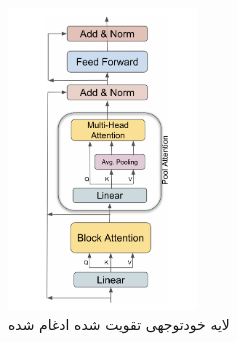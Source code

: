 \begin{figure}[!h]
	\begin{center}
		\includegraphics[height=8cm]{pooling_attention.png}
	\end{center}
	\caption{ لایه خودتوجهی تقویت شده ادغام شده \cite{Xiong2022AdaptingPT}}
	\label{fig:attention_pooling}
	\medskip
	\small
\end{figure}


	
	
	









